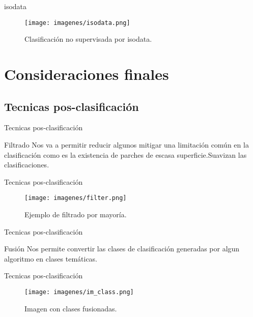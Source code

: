 \documentclass[handout]{beamer}
\begin{document}
\begin{frame}{isodata}
  \begin{figure}
    \texttt{[image: imagenes/isodata.png]}
    \caption{Clasificaci\'on no supervisada por isodata.}
  \end{figure}
\end{frame}

\section{Consideraciones finales}

\subsection{Tecnicas pos-clasificaci\'on}

\begin{frame}{Tecnicas pos-clasificaci\'on}
  \begin{block}{Filtrado}
    Nos va a permitir reducir algunos mitigar una limitaci\'on com\'un en la clasificaci\'on como es la existencia de parches de escasa superficie.\pause  Suavizan las clasificaciones.
  \end{block}
\end{frame}

\begin{frame}{Tecnicas pos-clasificaci\'on}
  \begin{figure}
    \texttt{[image: imagenes/filter.png]}
    \caption{Ejemplo de filtrado por mayor\'ia.}
  \end{figure}
\end{frame}

\begin{frame}{Tecnicas pos-clasificaci\'on}
  \begin{block}{Fusi\'on}
    Nos permite convertir las clases de clasificaci\'on generadas por algun algoritmo en clases tem\'aticas.
  \end{block}
\end{frame}

\begin{frame}{Tecnicas pos-clasificaci\'on}
  \begin{figure}
    \texttt{[image: imagenes/im\_class.png]}
    \caption{Imagen con clases fusionadas.}
  \end{figure}
\end{frame}
\end{document}
